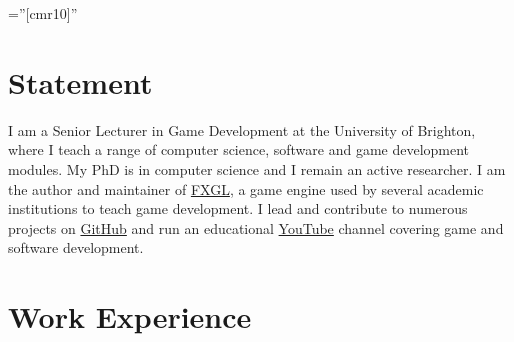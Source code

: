 \documentclass[a4paper,11pt]{article} %
\begin{document}
\pagestyle{empty} %

\font\fb=''[cmr10]'' %


\par{\bigskip\par} %

\section{Statement}

I am a Senior Lecturer in Game Development at the University of Brighton, where I teach a range of computer science, software and game development modules.
My PhD is in computer science and I remain an active researcher.
I am the author and maintainer of \href{https://github.com/AlmasB/FXGL}{FXGL}, a game engine used by several academic institutions to teach game development.
I lead and contribute to numerous projects on \href{https://github.com/AlmasB}{GitHub} and run an educational \href{https://www.youtube.com/almasb0/videos}{YouTube} channel covering game and software development.


\section{Work Experience}
\end{document}
